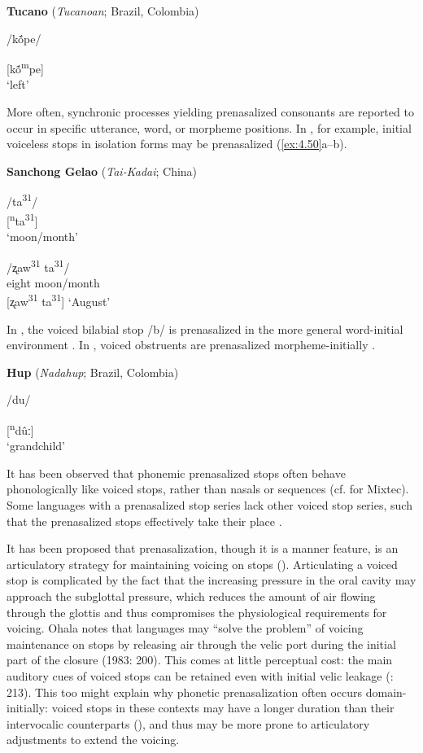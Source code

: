 \ea\label{ex:4.49}
  \textbf{Tucano} (\textit{Tucanoan}; Brazil, Colombia)

/kṍpe/

[kṍ\textsuperscript{m}pe]\\
\glt ‘left’
\citep[11]{West1980}
\z

  More often, synchronic processes yielding prenasalized consonants are reported to occur in specific utterance, word, or morpheme positions. In , for example, initial voiceless stops in isolation forms may be prenasalized (\ref{ex:4.50}a--b).

\ea\label{ex:4.50}
  \textbf{Sanchong Gelao} (\textit{Tai-Kadai}; China)

\ea  /ta\textsuperscript{31}/\\{}
  [\textsuperscript{n}ta\textsuperscript{31}]\\
\glt  ‘moon/month’

\ex  /ʐaw\textsuperscript{31}   ta\textsuperscript{31}/\\
  eight   moon/month\\{}
  [ʐaw\textsuperscript{31} ta\textsuperscript{31}]
\glt  ‘August’
\citep[40]{Shen2003}
\z
\z

  In , the voiced bilabial stop /b/ is prenasalized in the more general word-initial environment \citep{Fedden2007}. In , voiced obstruents are prenasalized morpheme-initially .

\ea\label{ex:4.51}
  \textbf{Hup} (\textit{Nadahup}; Brazil, Colombia)

/du/

[\textsuperscript{n}dûː]\\
\glt ‘grandchild’
\citep[54]{Epps2008}
\z

  It has been observed that phonemic prenasalized stops often behave phonologically like voiced stops, rather than nasals or sequences (cf. \citealt{IversonSalmons1996} for Mixtec). Some languages with a prenasalized stop series lack other voiced stop series, such that the prenasalized stops effectively take their place \citep[67-8]{Maddieson1984}.

  It has been proposed that prenasalization, though it is a manner feature, is an articulatory strategy for maintaining voicing on stops (\citealt{Ohala1983,HentonEtAl1992}). Articulating a voiced stop is complicated by the fact that the increasing pressure in the oral cavity may approach the subglottal pressure, which reduces the amount of air flowing through the glottis and thus compromises the physiological requirements for voicing. Ohala notes that languages may “solve the problem” of voicing maintenance on stops by releasing air through the velic port during the initial part of the closure (1983: 200). This comes at little perceptual cost: the main auditory cues of voiced stops can be retained even with initial velic leakage (\citealt{OhalaOhala1991}: 213). This too might explain why phonetic prenasalization often occurs domain-initially: voiced stops in these contexts may have a longer duration than their intervocalic counterparts (\citealt{FlegeBrown1982}), and thus may be more prone to articulatory adjustments to extend the voicing.

